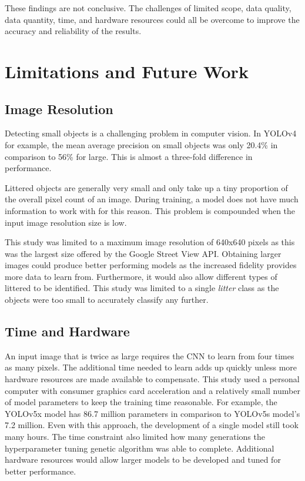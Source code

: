 \documentclass{thesis}
\begin{document}
These findings are not conclusive. The challenges of limited scope, data quality, data quantity, time, and hardware resources could all be overcome to improve the accuracy and reliability of the results.

\section{Limitations and Future Work}

\subsection{Image Resolution}

Detecting small objects is a challenging problem in computer vision. In YOLOv4 for example, the mean average precision on small objects was only 20.4\% in comparison to 56\% for large\cite{yolov4}. This is almost a three-fold difference in performance.

Littered objects are generally very small and only take up a tiny proportion of the overall pixel count of an image. During training, a model does not have much information to work with for this reason. This problem is compounded when the input image resolution size is low.

This study was limited to a maximum image resolution of 640x640 pixels as this was the largest size offered by the Google Street View API. Obtaining larger images could produce better performing models as the increased fidelity provides more data to learn from. Furthermore, it would also allow different types of littered to be identified. This study was limited to a single \textit{litter} class as the objects were too small to accurately classify any further.

\subsection{Time and Hardware}

An input image that is twice as large requires the CNN to learn from four times as many pixels. The additional time needed to learn adds up quickly unless more hardware resources are made available to compensate. This study used a personal computer with consumer graphics card acceleration and a relatively small number of model parameters to keep the training time reasonable. For example, the YOLOv5x model has 86.7 million parameters in comparison to YOLOv5s model's 7.2 million. Even with this approach, the development of a single model still took many hours. The time constraint also limited how many generations the hyperparameter tuning genetic algorithm was able to complete. Additional hardware resources would allow larger models to be developed and tuned for better performance. 
\end{document}
